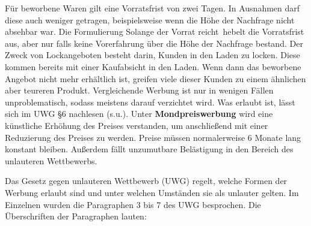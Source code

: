 Für beworbene Waren gilt eine Vorratsfrist von zwei Tagen. In Ausnahmen darf diese auch weniger getragen, beispielsweise wenn die Höhe der Nachfrage nicht absehbar war. Die Formulierung \ql Solange der Vorrat reicht\qr\ hebelt die Vorratsfrist aus, aber nur falls keine Vorerfahrung über die Höhe der Nachfrage bestand. Der Zweck von Lockangeboten besteht darin, Kunden in den Laden zu locken. Diese kommen bereits mit einer Kaufabsicht in den Laden. Wenn dann das beworbene Angebot nicht mehr erhältlich ist, greifen viele dieser Kunden zu einem ähnlichen aber teureren Produkt. Vergleichende Werbung ist nur in wenigen Fällen unproblematisch, sodass meistens darauf verzichtet wird. Was erlaubt ist, lässt sich im UWG §6 nachlesen (s.u.). Unter {\bf Mondpreiswerbung} wird eine künstliche Erhöhung des Preises verstanden, um anschließend mit einer Reduzierung des Preises zu werden. Preise müssen normalerweise 6 Monate lang konstant bleiben. Außerdem fällt unzumutbare Belästigung in den Bereich des unlauteren Wettbewerbs.

Das Gesetz gegen unlauteren Wettbewerb (UWG) regelt, welche Formen der Werbung erlaubt sind und unter welchen Umständen sie als unlauter gelten. Im Einzelnen wurden die Paragraphen 3 bis 7 des UWG besprochen. Die Überschriften der Paragraphen lauten:


